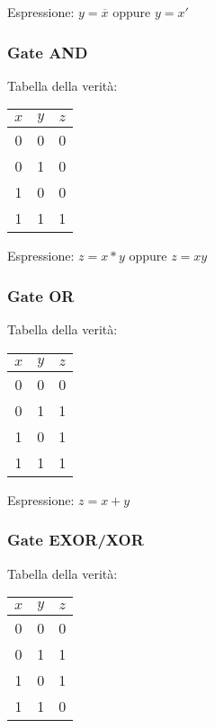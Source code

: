 \documentclass{article}
\begin{document}
\noindent
Espressione: $y = \overline{x}$ oppure $y = x'$

\subsubsection{Gate AND}

Tabella della verità:

\begin{center}
\begin{tabular}{ |c|c|c| }
\hline
$x$ & $y$ & $z$ \\
\hline
\hline
0 & 0 & 0 \\
0 & 1 & 0 \\
1 & 0 & 0 \\
1 & 1 & 1 \\
\hline
\end{tabular}
\end{center}

\noindent
Espressione: $z = x*y$ oppure $z = xy$

\subsubsection{Gate OR}

Tabella della verità:

\begin{center}
\begin{tabular}{ |c|c|c| }
\hline
$x$ & $y$ & $z$ \\
\hline
\hline
0 & 0 & 0 \\
0 & 1 & 1 \\
1 & 0 & 1 \\
1 & 1 & 1 \\
\hline
\end{tabular}
\end{center}

\noindent
Espressione: $z = x + y$

\subsubsection{Gate EXOR/XOR}

Tabella della verità:

\begin{center}
\begin{tabular}{ |c|c|c| }
\hline
$x$ & $y$ & $z$ \\
\hline
\hline
0 & 0 & 0 \\
0 & 1 & 1 \\
1 & 0 & 1 \\
1 & 1 & 0 \\
\hline
\end{tabular}
\end{center}
\end{document}
